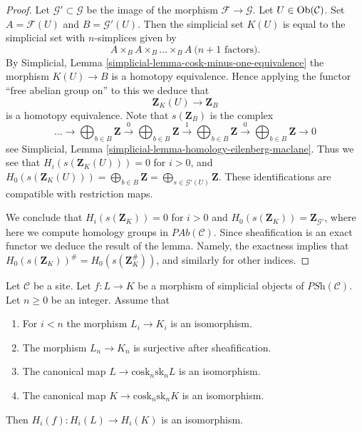 \begin{proof}
Let $\mathcal{G}' \subset \mathcal{G}$ be the image of
the morphism $\mathcal{F} \to \mathcal{G}$.
Let $U \in \mathop{\rm Ob}\nolimits(\mathcal{C})$. Set
$A = \mathcal{F}(U)$ and $B = \mathcal{G}'(U)$.
Then the simplicial set $K(U)$ is equal to the simplicial
set with $n$-simplices given by
$$
A \times_B A \times_B \ldots \times_B A\ (n + 1 \text{ factors)}.
$$
By Simplicial, Lemma \ref{simplicial-lemma-cosk-minus-one-equivalence}
the morphism $K(U) \to B$ is a homotopy equivalence. Hence
applying the functor ``free abelian group on'' to this
we deduce that
$$
\mathbf{Z}_K(U) \longrightarrow \mathbf{Z}_B
$$
is a homotopy equivalence. Note that $s(\mathbf{Z}_B)$ is
the complex
$$
\ldots \to
\bigoplus\nolimits_{b \in B}\mathbf{Z} \xrightarrow{0}
\bigoplus\nolimits_{b \in B}\mathbf{Z} \xrightarrow{1}
\bigoplus\nolimits_{b \in B}\mathbf{Z} \xrightarrow{0}
\bigoplus\nolimits_{b \in B}\mathbf{Z} \to 0
$$
see Simplicial, Lemma \ref{simplicial-lemma-homology-eilenberg-maclane}.
Thus we see that
$H_i(s(\mathbf{Z}_K(U))) = 0$ for $i > 0$, and
$H_0(s(\mathbf{Z}_K(U))) = \bigoplus_{b \in B}\mathbf{Z}
= \bigoplus_{s \in \mathcal{G}'(U)} \mathbf{Z}$.
These identifications are compatible with restriction
maps.

\medskip\noindent
We conclude that $H_i(s(\mathbf{Z}_K)) = 0$ for $i > 0$ and
$H_0(s(\mathbf{Z}_K)) = \mathbf{Z}_{\mathcal{G}'}$, where here
we compute homology groups in $\textit{PAb}(\mathcal{C})$. Since
sheafification is an exact functor we deduce the result
of the lemma. Namely, the exactness implies
that $H_0(s(\mathbf{Z}_K))^\# = H_0(s(\mathbf{Z}_K^\#))$,
and similarly for other indices.
\end{proof}

\begin{lemma}
\label{lemma-acyclicity}
Let $\mathcal{C}$ be a site.
Let $f : L \to K$ be a morphism of
simplicial objects of $\textit{PSh}(\mathcal{C})$.
Let $n \geq 0$ be an integer.
Assume that
\begin{enumerate}
\item For $i < n$ the morphism $L_i \to K_i$ is an isomorphism.
\item The morphism $L_n \to K_n$ is surjective after sheafification.
\item The canonical map $L \to \text{cosk}_n \text{sk}_n L$ is an isomorphism.
\item The canonical map $K \to \text{cosk}_n \text{sk}_n K$ is an isomorphism.
\end{enumerate}
Then $H_i(f) : H_i(L) \to H_i(K)$ is an isomorphism.
\end{lemma}

